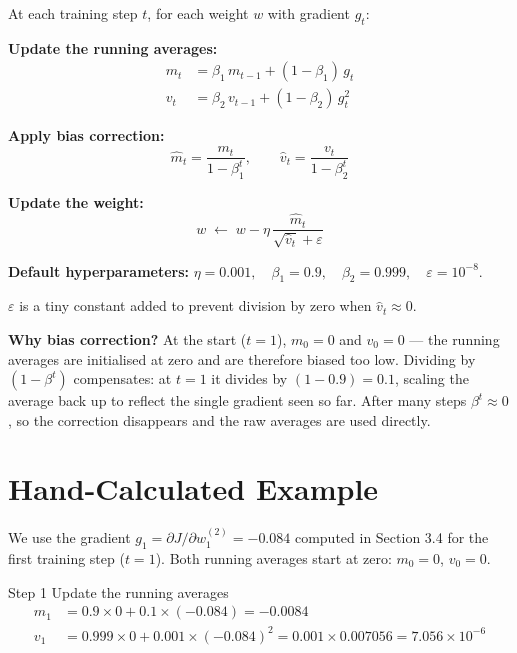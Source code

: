 \documentclass[12pt, a4paper]{article}
\newif\ifstudentmode
\newcommand{\sol}[2][6cm]{%
  \ifstudentmode
    \underline{\hspace{#1}}%
  \else
    {#2}%
  \fi
}
\theoremstyle{definition}
\begin{document}
\begin{adambox}
  At each training step $t$, for each weight $w$ with gradient $g_t$:

  \vspace{0.5em}
  \textbf{Update the running averages:}
  \begin{align*}
    m_t & = \beta_1 \, m_{t-1} + (1-\beta_1)\, g_t   \\
    v_t & = \beta_2 \, v_{t-1} + (1-\beta_2)\, g_t^2
  \end{align*}

  \textbf{Apply bias correction:}
  \[
    \hat{m}_t = \frac{m_t}{1 - \beta_1^t},
    \qquad
    \hat{v}_t = \frac{v_t}{1 - \beta_2^t}
  \]

  \textbf{Update the weight:}
  \[
    w \;\longleftarrow\; w - \eta \,\frac{\hat{m}_t}{\sqrt{\hat{v}_t} + \varepsilon}
  \]

  \textbf{Default hyperparameters:}
  $\eta = 0.001,\quad \beta_1 = 0.9,\quad \beta_2 = 0.999,\quad
    \varepsilon = 10^{-8}$.
\end{adambox}

\vspace{0.5em}

$\varepsilon$ is a tiny constant added to prevent division by zero when
$\hat{v}_t \approx 0$.

\begin{notebox}
  \textbf{Why bias correction?}
  At the start ($t = 1$), $m_0 = 0$ and $v_0 = 0$ --- the running averages
  are initialised at zero and are therefore biased too low.
  Dividing by $(1 - \beta^t)$ compensates: at $t=1$ it divides by $(1-0.9) = 0.1$,
  scaling the average back up to reflect the single gradient seen so far.
  After many steps $\beta^t \approx 0$, so the correction disappears and the
  raw averages are used directly.
\end{notebox}

\section{Hand-Calculated Example}

We use the gradient $g_1 = \partial J / \partial w^{(2)}_1 = -0.084$
computed in Section 3.4 for the first training step ($t = 1$).
Both running averages start at zero: $m_0 = 0$, $v_0 = 0$.

\begin{stepbox}{Step 1 \quad Update the running averages}
  \begin{align*}
    m_1 & = 0.9 \times 0 + 0.1 \times (-0.084)
    = \sol[4cm]{-0.0084}                             \\[6pt]
    v_1 & = 0.999 \times 0 + 0.001 \times (-0.084)^2
    = 0.001 \times 0.007056
    = \sol[4cm]{7.056 \times 10^{-6}}
  \end{align*}
\end{stepbox}
\end{document}
